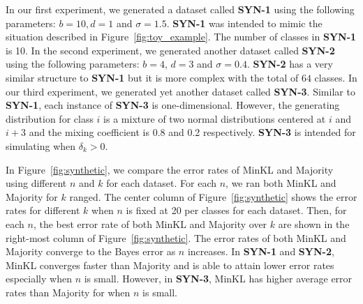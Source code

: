 \documentclass{article}
\begin{document}
In our first experiment, we generated a dataset called \textbf{SYN-1}
using the following parameters: $b=10, d=1$ and
$\sigma=1.5$. \textbf{SYN-1} was intended to mimic the situation
described in Figure~\ref{fig:toy_example}. The number of classes in
\textbf{SYN-1} is 10. In the second experiment, we generated another
dataset called \textbf{SYN-2} using the following parameters: $b=4$,
$d=3$ and $\sigma=0.4$. \textbf{SYN-2} has a very similar structure to
\textbf{SYN-1} but it is more complex with the total of $64$
classes. In our third experiment, we generated yet another dataset
called \textbf{SYN-3}. Similar to \textbf{SYN-1}, each instance of
\textbf{SYN-3} is one-dimensional. However, the generating
distribution for class $i$ is a mixture of two normal distributions
centered at $i$ and $i+3$ and the mixing coefficient is 0.8 and 0.2
respectively. \textbf{SYN-3} is intended for simulating when
$\delta_k > 0$.  

In Figure~\ref{fig:synthetic}, we compare the error rates of MinKL and
Majority using different $n$ and $k$ for each dataset. For each $n$,
we ran both MinKL and Majority for $k$ ranged. The center column of
Figure~\ref{fig:synthetic} shows the error rates for different $k$
when $n$ is fixed at 20 per classes for each dataset. Then, for each
$n$, the best error rate of both MinKL and Majority over $k$ are shown
in the right-most column of Figure~\ref{fig:synthetic}. The error
rates of both MinKL and Majority converge to the Bayes error as $n$
increases. In \textbf{SYN-1} and \textbf{SYN-2}, MinKL converges
faster than Majority and is able to attain lower error rates
especially when $n$ is small. However, in \textbf{SYN-3}, MinKL has
higher average error rates than Majority for when $n$ is small.
\end{document}
